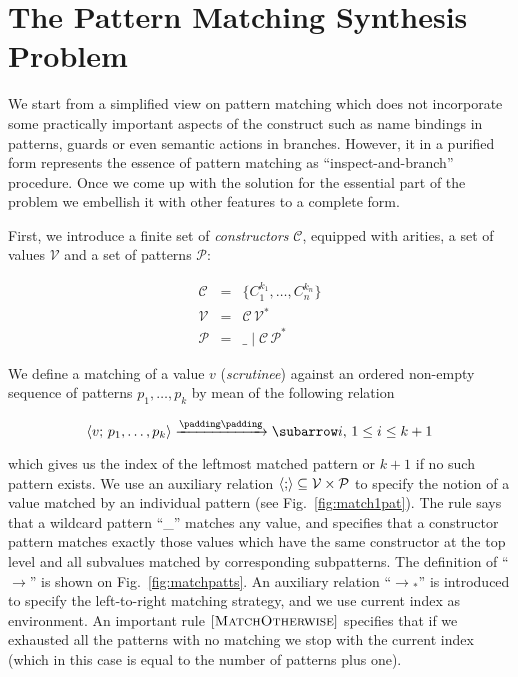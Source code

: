 \section{The Pattern Matching Synthesis Problem}

We start from a simplified view on pattern matching which does not incorporate some practically important aspects of the construct such as
name bindings in patterns, guards or even semantic actions in branches. However, it in a purified form represents the essence of pattern
matching as ``inspect-and-branch'' procedure. Once we come up with the solution for the essential part of the problem we embellish it with
other features to a complete form.

First, we introduce a finite set of \emph{constructors} $\mathcal C$, equipped with arities, a set of values $\mathcal{V}$
and a set of patterns $\mathcal{P}$:
 
\[
 \begin{array}{rcll}
    \mathcal{C} & = & \{ C_1^{k_1}, \dots, C_n^{k_n} \}\\
    \mathcal{V} & = & \mathcal{C}\,\mathcal{V}^*\\  
    \mathcal{P} & = & \_ \mid \mathcal{C}\,\mathcal{P}^*
 \end{array}
\]

We define a matching of a value $v$ (\emph{scrutinee}) against an ordered non-empty sequence of patterns $p_1,\dots,p_k$ by mean of the following
relation

\[
\setarrow{\xrightarrow}
\trans{\inbr{v;\,p_1,\dots,p_k}}{}{i},\,1\le i\le k+1
\]

which gives us the index of the leftmost matched pattern or $k+1$ if no such pattern exists. We use an auxiliary relation $\left<{;}\right>\subseteq\mathcal{V}\times\mathcal{P}$
to specify the notion of a value matched by an individual pattern (see Fig.~\ref{fig:match1pat}). The rule  says that
a wildcard pattern ``\_'' matches any value, and  specifies that a constructor pattern matches exactly those values which
have the same constructor at the top level and all subvalues matched by corresponding subpatterns. The definition of ``$\xrightarrow{}{}$'' is
shown on Fig.~\ref{fig:matchpatts}. An auxiliary relation ``$\xrightarrow{}{}_*$'' is introduced to specify the left-to-right matching strategy, and we
use current index as environment. An important rule $\mbox{[\textsc{MatchOtherwise}]}$ specifies that if we exhausted all the patterns with no matching we stop with
the current index (which in this case is equal to the number of patterns plus one).

